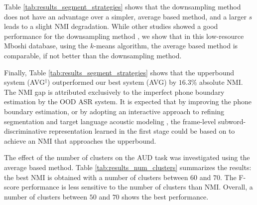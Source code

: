 \documentclass[a4paper]{article}
\begin{document}
Table \ref{tab:results_segment_strategies}  shows that the downsampling method does not have an advantage over a simpler, average based method, and a larger $s$ leads to a slight NMI degradation. While other studies showed a good performance for the downsampling method \cite{kamper2017embeded,Bhati2019unsupervised}, we show that in  this low-resource Mboshi   database, using the $k$-means algorithm,  the average based method is comparable, if not better than the downsampling method.

Finally, Table \ref{tab:results_segment_strategies} shows that the upperbound system (AVG$^\ddagger$) outperformed our best system (AVG) by $16.3\%$ absolute NMI. 
The   NMI gap is attributed exclusively to the imperfect phone boundary estimation by the OOD ASR system. It is expected that by improving the phone boundary estimation, or by adopting an interactive approach to refining segmentation and target language acoustic modeling \cite{kamper2017embeded}, the  frame-level subword-discriminative representation learned in the first stage  could be based on to achieve an NMI that approaches the upperbound. 










The effect of the number of clusters on the AUD task was investigated using the average based method.
Table \ref{tab:results_num_clusters} summarizes the results: the best NMI is obtained with a  number of clusters  between $60$ and $70$. 
The F-score performance is less sensitive to the number of clusters than NMI. 
Overall, a number of clusters between $50$ and $70$ shows the best performance.
\end{document}
